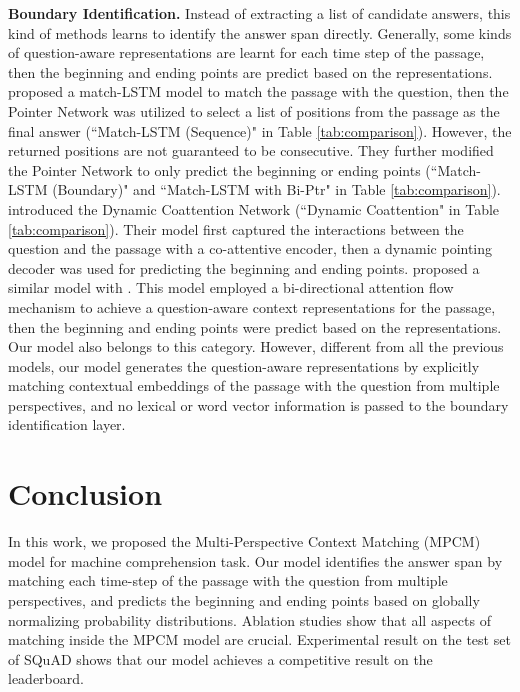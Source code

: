 \documentclass[11pt,letterpaper]{article}
\begin{document}
\textbf{Boundary Identification.} Instead of extracting a list of candidate answers, this kind of methods learns to identify the answer span directly. Generally, some kinds of question-aware representations are learnt for each time step of the passage, then the beginning and ending points are predict based on the representations.  proposed a match-LSTM model to match the passage with the question, then the Pointer Network  \cite{vinyals2015pointer} was utilized to select a list of positions from the passage as the final answer (``Match-LSTM (Sequence)" in Table \ref{tab:comparison}). However, the returned positions are not guaranteed to be consecutive. They further modified the Pointer Network to only predict the beginning or ending points (``Match-LSTM (Boundary)" and ``Match-LSTM with Bi-Ptr" in Table \ref{tab:comparison}). 
 introduced the Dynamic Coattention Network (``Dynamic Coattention" in Table \ref{tab:comparison}). Their model first captured the interactions between the question and the passage with a co-attentive encoder, then a dynamic pointing decoder was used for predicting the beginning and ending points. 
 proposed a similar model with . This model employed a bi-directional attention flow mechanism to achieve a question-aware context representations for the passage, then the beginning and ending points were predict based on the representations. 
Our model also belongs to this category. However, different from all the previous models, our model generates the question-aware representations by explicitly matching contextual embeddings of the passage with the question from multiple perspectives, and no lexical or word vector information is passed to the boundary identification layer.




\section{Conclusion}
In this work, we proposed the Multi-Perspective Context Matching (MPCM) model for machine comprehension task.  Our model identifies the answer span by matching each time-step of the passage with the question from multiple perspectives, and predicts the beginning and ending points based on globally normalizing probability distributions. Ablation studies show that all aspects of matching inside the MPCM model are crucial. Experimental result on the test set of SQuAD shows that our model achieves a competitive result on the leaderboard. 





\end{document}
